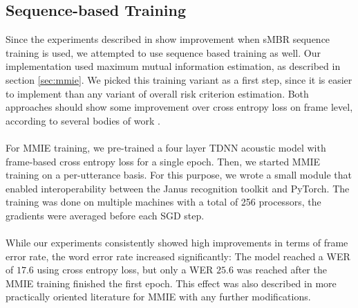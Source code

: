\subsection{Sequence-based Training}
Since the experiments described in \cite{peddinti2015jhu} show improvement when sMBR sequence training is used, we attempted to use sequence based training as well. Our implementation used maximum mutual information estimation, as described in section \ref{sec:mmie}. We picked this training variant as a first step, since it is easier to implement than any variant of overall risk criterion estimation. Both approaches should show some improvement over cross entropy loss on frame level, according to several bodies of work \cite{povey2005discriminative} \cite{ghoshal2013sequence}. \\ \\
For MMIE training, we pre-trained a four layer TDNN acoustic model with frame-based cross entropy loss for a single epoch. Then, we started MMIE training on a per-utterance basis. For this purpose, we wrote a small module that enabled interoperability between the Janus recognition toolkit and PyTorch. The training was done on multiple machines with a total of 256 processors, the gradients were averaged before each SGD step. \\ \\
While our experiments consistently showed high improvements in terms of frame error rate, the word error rate increased significantly: The model reached a WER of $17.6$ using cross entropy loss, but only a WER $25.6$ was reached after the MMIE training finished the first epoch. This effect was also described in more practically oriented literature \cite{su2013error} for MMIE with any further modifications. \\

